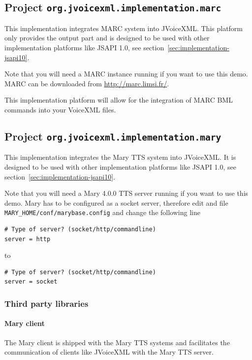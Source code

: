\documentclass[11pt,a4paper]{article}
\begin{document}
\subsection{Project \texttt{org.jvoicexml.implementation.marc}}

This implementation integrates MARC system into JVoiceXML. This platform
only provides the output part and is designed to be used with other
implementation platforms like JSAPI 1.0, see section~\ref{sec:implementation-jsapi10}.

Note that you will need a MARC instance running if you want to use this
demo. MARC can be downloaded from \url{http://marc.limsi.fr/}.

This implementation platform will allow for the integration of MARC BML commands
into your VoiceXML files.

\subsection{Project \texttt{org.jvoicexml.implementation.mary}}

This implementation integrates the Mary TTS system into JVoiceXML. It is
designed to be used with other implementation platforms like JSAPI 1.0, see
section~\ref{sec:implementation-jsapi10}.

Note that you will need a Mary 4.0.0  TTS server running if you want to use this
demo. Mary has to be configured as a socket server, therefore edit and file
\texttt{MARY\_HOME/conf/marybase.config} and change the following line 

\begin{lstlisting}
# Type of server? (socket/http/commandline)
server = http
\end{lstlisting}

to

\begin{lstlisting}
# Type of server? (socket/http/commandline)
server = socket
\end{lstlisting}

\subsubsection{Third party libraries}
\label{sec:mary-third-party-libr}

\paragraph{Mary client}

The Mary client is shipped with the Mary TTS systems and facilitates the
communication of clients like JVoiceXML with the Mary TTS server.
\end{document}

